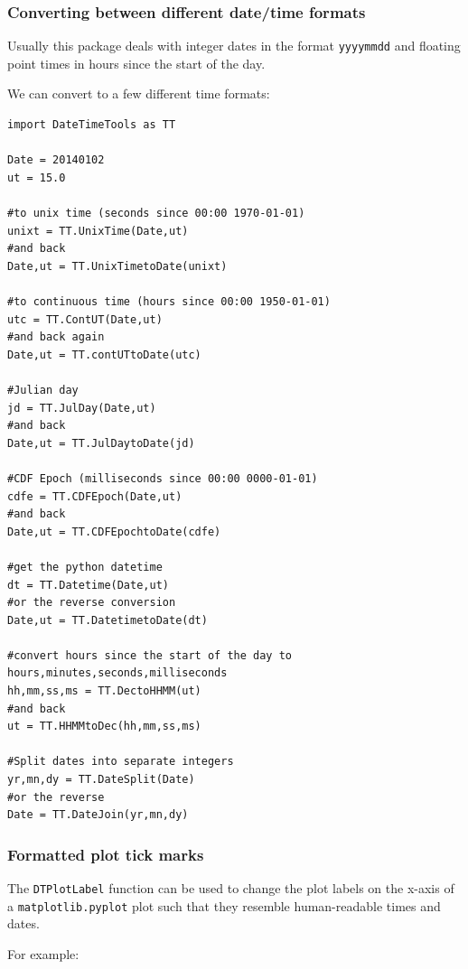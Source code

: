 \subsubsection{Converting between different date/time formats}

Usually this package deals with integer dates in the format \texttt{yyyymmdd} and floating point times in hours since the start of the day.

We can convert to a few different time formats:

\begin{verbatim}
import DateTimeTools as TT

Date = 20140102
ut = 15.0

#to unix time (seconds since 00:00 1970-01-01)
unixt = TT.UnixTime(Date,ut)
#and back
Date,ut = TT.UnixTimetoDate(unixt)

#to continuous time (hours since 00:00 1950-01-01)
utc = TT.ContUT(Date,ut)
#and back again
Date,ut = TT.contUTtoDate(utc)

#Julian day
jd = TT.JulDay(Date,ut)
#and back
Date,ut = TT.JulDaytoDate(jd)

#CDF Epoch (milliseconds since 00:00 0000-01-01)
cdfe = TT.CDFEpoch(Date,ut)
#and back
Date,ut = TT.CDFEpochtoDate(cdfe)

#get the python datetime
dt = TT.Datetime(Date,ut)
#or the reverse conversion
Date,ut = TT.DatetimetoDate(dt)

#convert hours since the start of the day to hours,minutes,seconds,milliseconds
hh,mm,ss,ms = TT.DectoHHMM(ut)
#and back
ut = TT.HHMMtoDec(hh,mm,ss,ms)

#Split dates into separate integers
yr,mn,dy = TT.DateSplit(Date)
#or the reverse
Date = TT.DateJoin(yr,mn,dy)
\end{verbatim}

\subsubsection{Formatted plot tick marks}

The \texttt{DTPlotLabel} function can be used to change the plot labels on the x-axis of a \texttt{matplotlib.pyplot} plot such that they resemble human-readable times and dates.

For example:


